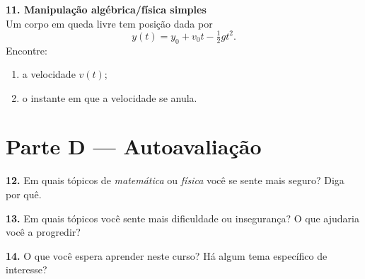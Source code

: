 \vspace{3cm}

\textbf{11. Manipulação algébrica/física simples} \\
Um corpo em queda livre tem posição dada por
\[
  y(t) = y_0 + v_0 t - \tfrac{1}{2}gt^2.
\]
Encontre:
\begin{enumerate}
  \item[a)] a velocidade $v(t)$;
  \item[b)] o instante em que a velocidade se anula.
\end{enumerate}




\section*{Parte D — Autoavaliação}

\textbf{12.} Em quais tópicos de \textit{matemática} ou \textit{física} você se sente
mais seguro? Diga por quê.

\answerlines{2.8cm}

\textbf{13.} Em quais tópicos você sente mais dificuldade ou insegurança? O que ajudaria
você a progredir?

\answerlines{2.8cm}

\textbf{14.} O que você espera aprender neste curso? Há algum tema específico de
interesse?

\answerlines{2.8cm}



